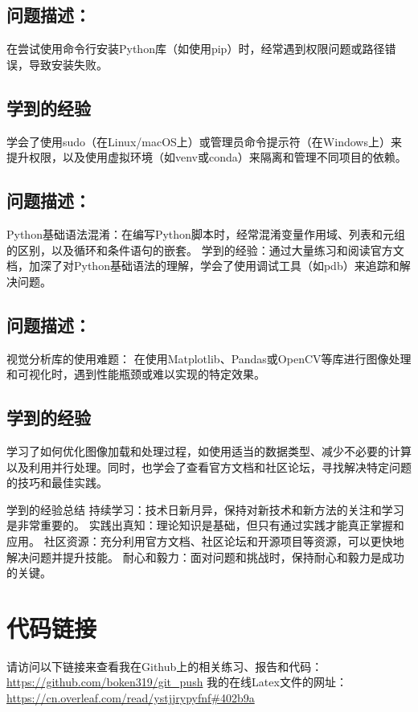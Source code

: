 \documentclass[a4paper, 12pt]{article}
\begin{document}
 \subsection{问题描述：}在尝试使用命令行安装Python库（如使用pip）时，经常遇到权限问题或路径错误，导致安装失败。
 \subsection{学到的经验}
  学会了使用sudo（在Linux/macOS上）或管理员命令提示符（在Windows上）来提升权限，以及使用虚拟环境（如venv或conda）来隔离和管理不同项目的依赖。

 \subsection{问题描述：}Python基础语法混淆：在编写Python脚本时，经常混淆变量作用域、列表和元组的区别，以及循环和条件语句的嵌套。
学到的经验：通过大量练习和阅读官方文档，加深了对Python基础语法的理解，学会了使用调试工具（如pdb）来追踪和解决问题。

\subsection{问题描述：}
视觉分析库的使用难题：
在使用Matplotlib、Pandas或OpenCV等库进行图像处理和可视化时，遇到性能瓶颈或难以实现的特定效果。
  \subsection{学到的经验}
  学习了如何优化图像加载和处理过程，如使用适当的数据类型、减少不必要的计算以及利用并行处理。同时，也学会了查看官方文档和社区论坛，寻找解决特定问题的技巧和最佳实践。

学到的经验总结
持续学习：技术日新月异，保持对新技术和新方法的关注和学习是非常重要的。
实践出真知：理论知识是基础，但只有通过实践才能真正掌握和应用。
社区资源：充分利用官方文档、社区论坛和开源项目等资源，可以更快地解决问题并提升技能。
耐心和毅力：面对问题和挑战时，保持耐心和毅力是成功的关键。

 \section{代码链接}
      请访问以下链接来查看我在Github上的相关练习、报告和代码：
\url{https://github.com/boken319/git_push}
我的在线Latex文件的网址：
\url{https://cn.overleaf.com/read/ystjjrypyfnf#402b9a}
\end{document}
